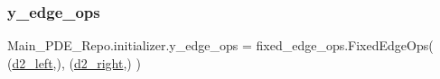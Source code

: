 \mbox{\label{namespaceMain__PDE__Repo_1_1initializer_ae555cb401c7c00308a6d2917bf4459fb}} 
\subsubsection{\texorpdfstring{y\+\_\+edge\+\_\+ops}{y\_edge\_ops}}
{\footnotesize\ttfamily Main\+\_\+\+P\+D\+E\+\_\+\+Repo.\+initializer.\+y\+\_\+edge\+\_\+ops = fixed\+\_\+edge\+\_\+ops.\+Fixed\+Edge\+Ops( (\hyperlink{namespaceMain__PDE__Repo_1_1initializer_a24c8c2b7c649edf215c2573852cd73fc}{d2\+\_\+left},), (\hyperlink{namespaceMain__PDE__Repo_1_1initializer_afd3adfb33fdba510d2b75e2cd9e01e42}{d2\+\_\+right},) )}

